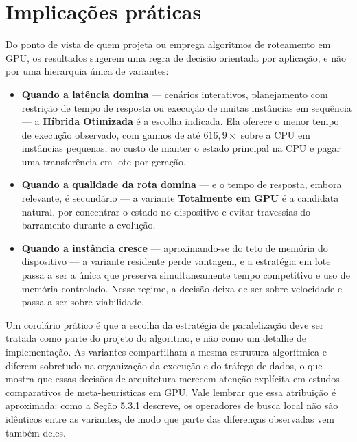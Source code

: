\section{Implicações práticas}\label{sec-54-implicacoes-praticas}

Do ponto de vista de quem projeta ou emprega algoritmos de roteamento em GPU, os resultados sugerem uma regra de decisão orientada por aplicação, e não por uma hierarquia única de variantes:

\begin{itemize}
  \tightlist
  \item
        \textbf{Quando a latência domina} — cenários interativos, planejamento com restrição de tempo de resposta ou execução de muitas instâncias em sequência — a \textbf{Híbrida Otimizada} é a escolha indicada.
        Ela oferece o menor tempo de execução observado, com ganhos de até \(616{,}9\times\) sobre a CPU em instâncias pequenas, ao custo de manter o estado principal na CPU e pagar uma transferência em lote por geração.
  \item
        \textbf{Quando a qualidade da rota domina} — e o tempo de resposta, embora relevante, é secundário — a variante \textbf{Totalmente em GPU} é a candidata natural, por concentrar o estado no dispositivo e evitar travessias do barramento durante a evolução.
  \item
        \textbf{Quando a instância cresce} — aproximando-se do teto de memória do dispositivo — a variante residente perde vantagem, e a estratégia em lote passa a ser a única que preserva simultaneamente tempo competitivo e uso de memória controlado.
        Nesse regime, a decisão deixa de ser sobre velocidade e passa a ser sobre viabilidade.
\end{itemize}

Um corolário prático é que a escolha da estratégia de paralelização deve ser tratada como parte do projeto do algoritmo, e não como um detalhe de implementação.
As variantes compartilham a mesma estrutura algorítmica e diferem sobretudo na organização da execução e do tráfego de dados, o que mostra que essas decisões de arquitetura merecem atenção explícita em estudos comparativos de meta-heurísticas em GPU.
Vale lembrar que essa atribuição é aproximada: como a \hyperref[sec-5311-semantica-operadores]{Seção 5.3.1} descreve, os operadores de busca local não são idênticos entre as variantes, de modo que parte das diferenças observadas vem também deles.


